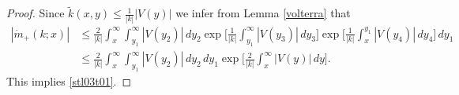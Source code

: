 \begin{proof}
Since $\tilde k(x,y) \leq \frac{1}{|k|}|V(y)|$ we infer from Lemma \ref{volterra} that
\begin{equation*}
\begin{split}
  |\dot m_+(k;x)|
     & \leq \frac{2}{|k|} \int_x^\infty \int_{y_1}^\infty |V(y_2)|\, dy_2 \exp\big[\frac{1}{|k|}\int_{y_1}^\infty |V(y_3)|\, dy_3\big]
                   \exp\big[\frac{1}{|k|}\int_x^{y_1} |V(y_4)|\, dy_4\big] \, dy_1\\
     & \leq \frac{2}{|k|} \int_x^\infty \int_{y_1}^\infty |V(y_2)|\, dy_2\, dy_1 \exp\big[\frac{2}{|k|}\int_x^\infty |V(y)|\, dy\big] .
\end{split}
\end{equation*}
This implies \eqref{stl03t01}.
\end{proof}                           

